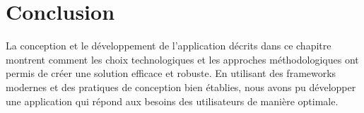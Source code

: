 \newpage

\section*{Conclusion}

\hspace{16pt}La conception et le développement de l'application décrits dans ce chapitre montrent comment les choix technologiques et les approches méthodologiques ont permis de créer une solution efficace et robuste. En utilisant des frameworks modernes et des pratiques de conception bien établies, nous avons pu développer une application qui répond aux besoins des utilisateurs de manière optimale.

\pagebreak
